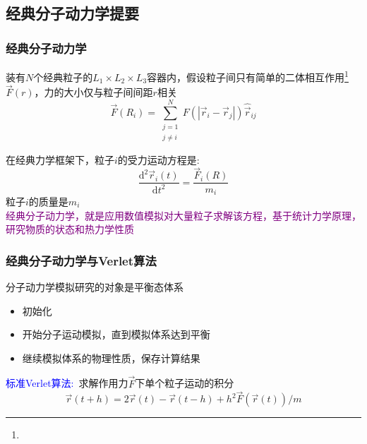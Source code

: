 \subsection{经典分子动力学提要}
\frame
{
	\frametitle{经典分子动力学}
	装有$N$个经典粒子的$L_1\times L_2\times L_3$容器内，假设粒子间只有简单的二体相互作用\footnote{\fontsize{7.2pt}{6.2pt}\selectfont{二体作用是粒子间多体相互作用的简化，只考虑粒子两两间彼此相互作用。}}$\vec F(r)$，力的大小仅与粒子间间距$r$相关
	\begin{displaymath}
		\vec F(R_i)=\sum_{\substack{j=1\\j\neq i}}^N F(|\vec r_i-\vec r_j|)\hat{\vec r}_{ij}
	\end{displaymath}
	{\fontsize{7.2pt}{6.2pt}}

	在经典力学框架下，粒子$i$的受力运动方程是:~
	\begin{displaymath}
		\dfrac{\mathrm{d}^2\vec r_i(t)}{\mathrm{d}t^2}=\dfrac{\vec F_i(R)}{m_i}
	\end{displaymath}
	粒子$i$的质量是$m_i$\\
	\textcolor{purple}{经典分子动力学，就是应用数值模拟对大量粒子求解该方程，基于统计力学原理，研究物质的状态和热力学性质}
}

\frame
{
	\frametitle{经典分子动力学与\textrm{Verlet}算法}
	分子动力学模拟研究的对象是平衡态体系
	\begin{itemize}
		\item 初始化
		\item 开始分子运动模拟，直到模拟体系达到平衡
		\item 继续模拟体系的物理性质，保存计算结果
	\end{itemize}
	\textcolor{blue}{标准\textrm{Verlet}算法:~}求解作用力$\vec F$下单个粒子运动的积分
	\begin{displaymath}
		\vec r(t+h)=2\vec r(t)-\vec r(t-h)+h^2\vec F(\vec r(t))/m
	\end{displaymath}
	{\fontsize{7.2pt}{6.2pt}}
}

